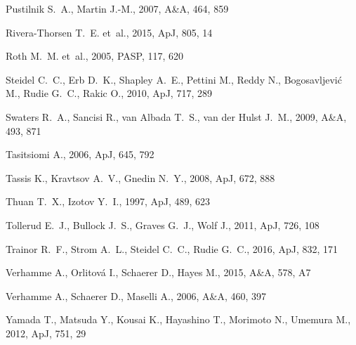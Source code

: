 \documentclass[a4,useAMS,usenatbib,usegraphicx]{mn2e}
\newcommand{\apj}{ApJ}
\newcommand{\aap}{A\&A}
\newcommand{\pasp}{PASP}
\begin{document}
\begin{thebibliography}{}
{Pustilnik} S.~A.,  {Martin} J.-M.,  2007, \aap, 464, 859

{Rivera-Thorsen} T.~E.  et~al., 2015, \apj, 805, 14

{Roth} M.~M.  et~al., 2005, \pasp, 117, 620

{Steidel} C.~C.,  {Erb} D.~K.,  {Shapley} A.~E.,  {Pettini} M.,  {Reddy} N.,
  {Bogosavljevi{\'c}} M.,  {Rudie} G.~C.,    {Rakic} O.,  2010, \apj, 717, 289

{Swaters} R.~A.,  {Sancisi} R.,  {van Albada} T.~S.,    {van der Hulst} J.~M.,
  2009, \aap, 493, 871

{Tasitsiomi} A.,  2006, \apj, 645, 792

{Tassis} K.,  {Kravtsov} A.~V.,    {Gnedin} N.~Y.,  2008, \apj, 672, 888

{Thuan} T.~X.,  {Izotov} Y.~I.,  1997, \apj, 489, 623

{Tollerud} E.~J.,  {Bullock} J.~S.,  {Graves} G.~J.,    {Wolf} J.,  2011, \apj,
  726, 108

{Trainor} R.~F.,  {Strom} A.~L.,  {Steidel} C.~C.,    {Rudie} G.~C.,  2016,
  \apj, 832, 171

{Verhamme} A.,  {Orlitov{\'a}} I.,  {Schaerer} D.,    {Hayes} M.,  2015, \aap,
  578, A7

{Verhamme} A.,  {Schaerer} D.,    {Maselli} A.,  2006, \aap, 460, 397

{Yamada} T.,  {Matsuda} Y.,  {Kousai} K.,  {Hayashino} T.,  {Morimoto} N.,
  {Umemura} M.,  2012, \apj, 751, 29

\end{thebibliography}
\end{document}
